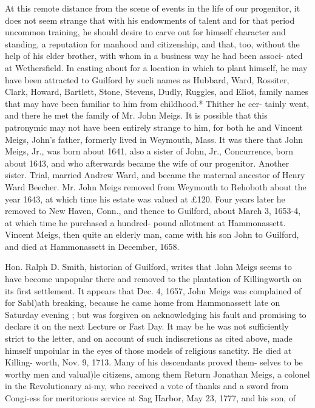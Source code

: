 \documentclass{book}
\begin{document}
At this remote distance from the scene of events in the life of 
our progenitor, it does not seem strange that with his endowments 
of talent and for that period uncommon training, he should desire 
to carve out for himself character and standing, a reputation for 
manhood and citizenship, and that, too, without the help of his 
elder brother, with whom in a business way he had been associ- 
ated at Wethersfield. In casting about for a location in which to 
plant himself, he may have been attracted to Guilford by sucli 
names as Hubbard, Ward, Rossiter, Clark, Howard, Bartlett, 
Stone, Stevens, Dudly, Ruggles, and Eliot, family names that 
may have been familiar to him from childhood.* Thither he cer- 
tainly went, and there he met the family of Mr. John Meigs. It 
is possible that this patronymic may not have been entirely strange 
to him, for both he and Vincent Meigs, John's father, formerly 
lived in Weymouth, Mass. It was there that John Meigs, Jr., 
was born about 1641, also a sister of John, Jr., Concurrence, 
born about 1643, and who afterwards became the wife of our 
progenitor. Another sister. Trial, married Andrew Ward, and 
became the maternal ancestor of Henry Ward Beecher. Mr. 
John Meigs removed from Weymouth to Rehoboth about the year 
1643, at which time his estate was valued at £120. Four years 
later he removed to New Haven, Conn., and thence to Guilford, 
about March 3, 1653-4, at which time he purchased a hundred- 
pound allotment at Hammonassett. Vincent Meigs, then quite 
an elderly man, came with his son John to Guilford, and died at 
Hammonassett in December, 1658. 

Hon. Ralph D. Smith, historian of Guilford, writes that .lohn 
Meigs seems to have become unpopular there and removed to the 
plantation of Killingworth on its first settlement. It appears 
that Dec. 4, 1657, John Meigs was complained of for Sabl)ath 
breaking, because he came home from Hammonassett late on 
Saturday evening ; but was forgiven on acknowledging his fault 
and promising to declare it on the next Lecture or Fast Day. It 
may be he was not sufficiently strict to the letter, and on account 
of such indiscretions as cited above, made himself unpoiular in 
the eyes of those models of religious sanctity. He died at Killing- 
worth, Nov. 9, 1713. Many of his descendants proved them- 
selves to be worthy men and valual)le citizens, among them 
Return Jonathan Meigs, a colonel in the Revolutionary ai-my, 
who received a vote of thanks and a sword from Congi-ess for 
meritorious service at Sag Harbor, May 23, 1777, and his son, of 
\end{document}
